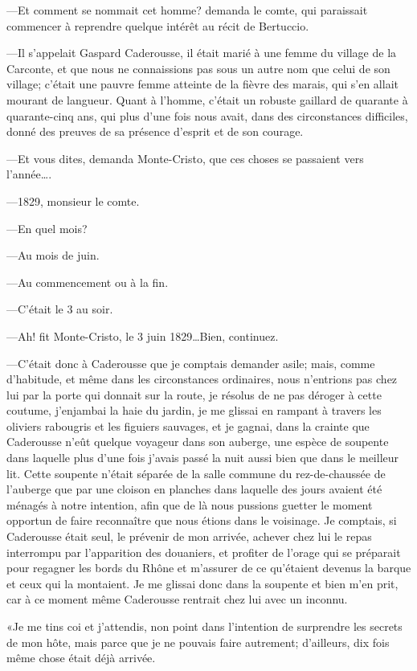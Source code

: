 —Et comment se nommait cet homme? demanda le comte, qui paraissait commencer à reprendre quelque intérêt au récit de Bertuccio. 

—Il s'appelait Gaspard Caderousse, il était marié à une femme du village de la Carconte, et que nous ne connaissions pas sous un autre nom que celui de son village; c'était une pauvre femme atteinte de la fièvre des marais, qui s'en allait mourant de langueur. Quant à l'homme, c'était un robuste gaillard de quarante à quarante-cinq ans, qui plus d'une fois nous avait, dans des circonstances difficiles, donné des preuves de sa présence d'esprit et de son courage. 

—Et vous dites, demanda Monte-Cristo, que ces choses se passaient vers l'année\dots. 

—1829, monsieur le comte. 

—En quel mois? 

—Au mois de juin. 

—Au commencement ou à la fin. 

—C'était le 3 au soir. 

—Ah! fit Monte-Cristo, le 3 juin 1829\dots Bien, continuez. 

—C'était donc à Caderousse que je comptais demander asile; mais, comme d'habitude, et même dans les circonstances ordinaires, nous n'entrions pas chez lui par la porte qui donnait sur la route, je résolus de ne pas déroger à cette coutume, j'enjambai la haie du jardin, je me glissai en rampant à travers les oliviers rabougris et les figuiers sauvages, et je gagnai, dans la crainte que Caderousse n'eût quelque voyageur dans son auberge, une espèce de soupente dans laquelle plus d'une fois j'avais passé la nuit aussi bien que dans le meilleur lit. Cette soupente n'était séparée de la salle commune du rez-de-chaussée de l'auberge que par une cloison en planches dans laquelle des jours avaient été ménagés à notre intention, afin que de là nous pussions guetter le moment opportun de faire reconnaître que nous étions dans le voisinage. Je comptais, si Caderousse était seul, le prévenir de mon arrivée, achever chez lui le repas interrompu par l'apparition des douaniers, et profiter de l'orage qui se préparait pour regagner les bords du Rhône et m'assurer de ce qu'étaient devenus la barque et ceux qui la montaient. Je me glissai donc dans la soupente et bien m'en prit, car à ce moment même Caderousse rentrait chez lui avec un inconnu. 

«Je me tins coi et j'attendis, non point dans l'intention de surprendre les secrets de mon hôte, mais parce que je ne pouvais faire autrement; d'ailleurs, dix fois même chose était déjà arrivée. 

